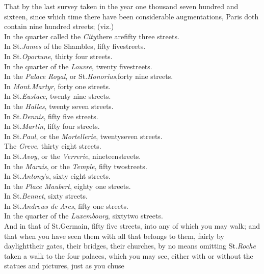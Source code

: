 \documentclass{article}
\begin{document}
That by the last survey taken in the year one thousand seven
hundred and sixteen, since which time there have been considerable
augmentations, Paris doth contain nine hundred streets;
(viz.)\\[2pt]
In the quarter called the \textit{City}\tsk there are\bnq fifty three streets.\\
In St.\@ \textit{James} of the Shambles, fifty five\bnq streets.\\
In St.\@ \textit{Oportune}, thirty four streets.\\
In the quarter of the \textit{Louvre}, twenty five\bnq streets.\\
In the \textit{Palace Royal}, or St.\@ \textit{Honorius},\bnq forty nine streets.\\
In \textit{Mont.\@ Martyr}, forty one streets.\\
In St.\@ \textit{Eustace}, twenty nine streets.\\
\newpage\noindent
In the \textit{Halles}, twenty seven streets.\\
In St.\@ \textit{Dennis}, fifty five streets.\\
In St.\@ \textit{Martin}, fifty four streets.\\
In St.\@ \textit{Paul}, or the \textit{Mortellerie}, twenty\bnq seven streets.\\
The \textit{Greve}, thirty eight streets.\\
In St.\@ \textit{Avoy}, or the \textit{Verrerie}, nineteen\bnq streets.\\
In the \textit{Marais}, or the \textit{Temple}, fifty two\bnq streets.\\
In St.\@ \textit{Antony}’s, sixty eight streets.\\
In the \textit{Place Maubert}, eighty one streets.\\
In St.\@ \textit{Bennet}, sixty streets.\\
In St.\@ \textit{Andrews de Arcs}, fifty one streets.\\
In the quarter of the \textit{Luxembourg}, sixty\bnq two streets.\\[2pt]
And in that of St.\@ Germain, fifty five streets, into any of
which you may walk; and that when you have seen them with all that
belongs to them, fairly by daylight\tsk their gates, their
bridges, their \break
{}\break
churches, by no means omitting
St.\@ \textit{Roche}\break
{}
taken a walk to the four palaces, which you may see, either with or
without the statues and pictures, just as you chuse\tsk
\end{document}
